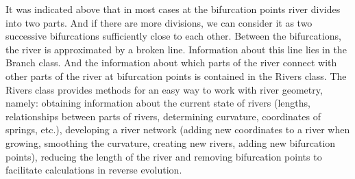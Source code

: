 \documentclass[]{pracamgr}
\begin{document}
      It was indicated above that in most cases at the bifurcation points river divides into two parts. And if there are more divisions, we can consider it as two successive bifurcations sufficiently close to each other. Between the bifurcations, the river is approximated by a broken line. Information about this line lies in the Branch class. And the information about which parts of the river connect with other parts of the river at bifurcation points is contained in the Rivers class. The Rivers class provides methods for an easy way to work with river geometry, namely: obtaining information about the current state of rivers (lengths, relationships between parts of rivers, determining curvature, coordinates of springs, etc.), developing a river network (adding new coordinates to a river when growing, smoothing the curvature, creating new rivers, adding new bifurcation points), reducing the length of the river and removing bifurcation points to facilitate calculations in reverse evolution.
      
\end{document}
